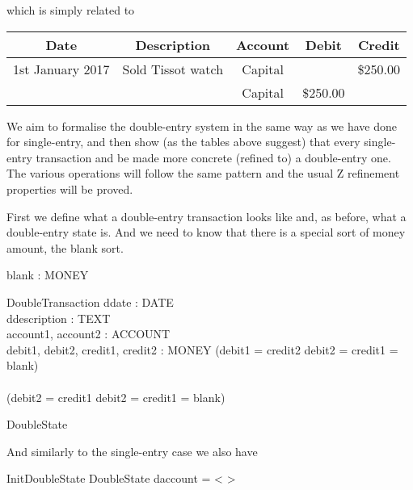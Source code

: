 \documentclass[11pt]{amsart}
\begin{document}
which is simply related to

\begin{table}[h]
\begin{center}
\begin{tabular}{|c|c|c|c|c|}
Date & Description & Account & Debit & Credit\\
\hline \hline
1st January 2017 & Sold Tissot watch & Capital &   &\$250.00 \\
\hline
& &  Capital & \$250.00 &  \\
\end{tabular}
\end{center}
\label{default}
\end{table}%

\newpage



We aim to formalise the double-entry system in the same way as we have done for single-entry, and then show (as the tables above suggest) that every single-entry transaction and be made more concrete (refined to) a double-entry one. The various operations will follow the same pattern and the usual Z refinement properties will be proved.

First we define what a double-entry transaction looks like and, as before, what a double-entry state is. And we need to know that there is a special sort of money amount, the blank sort.

\begin{axdef}
blank : MONEY
\end{axdef}

\begin{schema}{DoubleTransaction}
ddate : DATE\\
ddescription : TEXT\\
account1, account2 : ACCOUNT\\
debit1, debit2, credit1, credit2 : MONEY
\where
(debit1 = credit2 \land debit2 = credit1 = blank)\\
\lor\\
(debit2 = credit1 \land debit2 = credit1 = blank)
\end{schema}

\begin{zed}
DoubleState 
\end{zed}

And similarly to the single-entry case we also have

\begin{schema}{InitDoubleState}
DoubleState
\where
daccount = < >
\end{schema}
\end{document}
